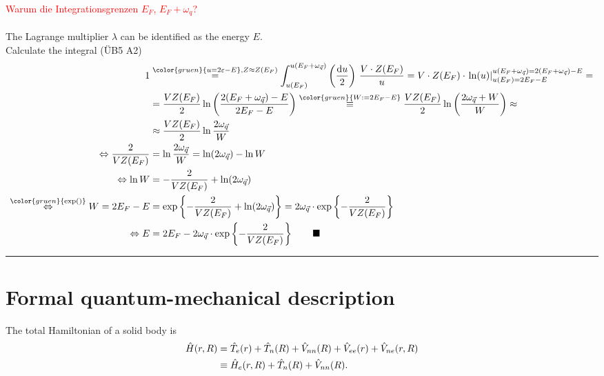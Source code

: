 \documentclass{article}
\newcommand{\diff}{\mathrm{d}}
\newcommand{\lr}[1]{\left(#1\right)}
\newcommand{\lrschweif}[1]{\left\{#1\right\}}
\newcommand{\comment}[1]{{\color{gruen} {#1}}}
\begin{document}
{\textcolor{red}{ Warum die Integrationsgrenzen $E_F$, $E_F + \omega_q$?}\\
\\
	The Lagrange multiplier $\lambda$ can be identified as the energy $E$.\\
	Calculate the integral \textcolor{gruen}{(ÜB5 A2)}
		\begin{align*}
			1 &\stackrel{\comment{u=2\varepsilon-E}, Z \approx Z(E_F)}{=} \int_{u(E_F)}^{u(E_F + \omega_{\vec{q}})} \lr{ \frac{\diff u}{2} } \, \frac{V \cdot Z(E_F)}{u} = V\cdot Z(E_F) \cdot \left. \ln(u) \right|_{u(E_F) = 2E_F - E}^{u(E_F + \omega_{\vec{q}}) = 2(E_F + \omega_{\vec{q}}) - E} = \\
			&= \frac{V Z(E_F)}{2} \ln\lr{ \frac{ 2(E_F + \omega_{\vec{q}}) - E }{ 2E_F - E } } \stackrel{\comment{W:=2E_F - E}}{\equiv} \frac{V Z(E_F)}{2} \ln\lr{ \frac{2\omega_{\vec{q}} + W}{W} } \approx \\
			&\approx \frac{V Z(E_F)}{2} \ln \frac{2\omega_{\vec{q}}}{W} \\
		\Leftrightarrow \frac{2}{V Z(E_F)} &= \ln \frac{2\omega_{\vec{q}}}{W} = \ln(2\omega_{\vec{q}}) - \ln W \\
			\Leftrightarrow \ln W &= -\frac{2}{V Z(E_F)} + \ln (2\omega_{\vec{q}}) \\
			\stackrel{\comment{\exp()}}{\Leftrightarrow} W = 2E_F - E &= \exp\lrschweif{ - \frac{2}{V Z(E_F)} + \ln (2\omega_{\vec{q}}) } = 2\omega_{\vec{q}}\cdot \exp\lrschweif{ -\frac{2}{V Z(E_F)} } \\
			\Leftrightarrow E &= 2E_F - 2\omega_{\vec{q}}\cdot \exp\lrschweif{ -\frac{2}{V Z(E_F)} } \qquad \blacksquare
		\end{align*}


\hrule
}






\newpage


\section{Formal quantum-mechanical description}
The total Hamiltonian of a solid body is
	\begin{align}
		\hat{H}(r,R) &= \hat{T}_e(r) + \hat{T}_n(R) + \hat{V}_{nn}(R) + \hat{V}_{ee}(r) + \hat{V}_{ne}(r,R) \\
		&\equiv \hat{H}_e(r,R) + \hat{T}_n(R) + \hat{V}_{nn}(R). \notag
	\end{align}
\end{document}
